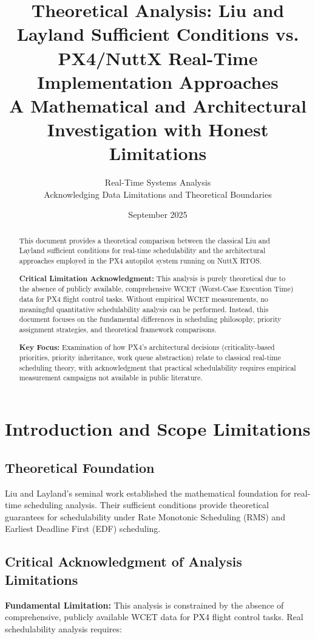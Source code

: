 \documentclass[12pt,a4paper]{article}
\title{Theoretical Analysis: Liu and Layland Sufficient Conditions vs. PX4/NuttX Real-Time Implementation Approaches\\
\large{A Mathematical and Architectural Investigation with Honest Limitations}}
\author{Real-Time Systems Analysis\\
\small{Acknowledging Data Limitations and Theoretical Boundaries}}
\date{September 2025}
\begin{document}
\maketitle

\begin{abstract}
This document provides a theoretical comparison between the classical Liu and Layland sufficient conditions for real-time schedulability and the architectural approaches employed in the PX4 autopilot system running on NuttX RTOS.

\textbf{Critical Limitation Acknowledgment:} This analysis is purely theoretical due to the absence of publicly available, comprehensive WCET (Worst-Case Execution Time) data for PX4 flight control tasks. Without empirical WCET measurements, no meaningful quantitative schedulability analysis can be performed. Instead, this document focuses on the fundamental differences in scheduling philosophy, priority assignment strategies, and theoretical framework comparisons.

\textbf{Key Focus:} Examination of how PX4's architectural decisions (criticality-based priorities, priority inheritance, work queue abstraction) relate to classical real-time scheduling theory, with acknowledgment that practical schedulability requires empirical measurement campaigns not available in public literature.
\end{abstract}

\section{Introduction and Scope Limitations}

\subsection{Theoretical Foundation}

Liu and Layland's seminal work \cite{liu1973scheduling} established the mathematical foundation for real-time scheduling analysis. Their sufficient conditions provide theoretical guarantees for schedulability under Rate Monotonic Scheduling (RMS) and Earliest Deadline First (EDF) scheduling.

\subsection{Critical Acknowledgment of Analysis Limitations}

\textbf{Fundamental Limitation:} This analysis is constrained by the absence of comprehensive, publicly available WCET data for PX4 flight control tasks. Real schedulability analysis requires:
\end{document}
